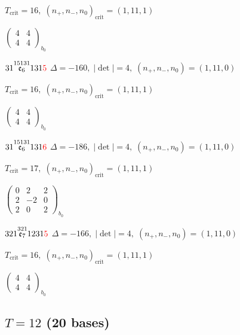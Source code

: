 \documentclass[10pt]{article}
\begin{document}
\hspace{1em}$T_{\text{crit}}=16,\; (n_+,n_-,n_0)_{\text{crit}}=(1,11,1)$

\hspace{2em}$\left(\begin{smallmatrix}4 & 4 \\ 4 & 4\end{smallmatrix}\right)_{\!b_0}$

\smallskip

$31\overset{15131}{\mathfrak{e}_6}131\textcolor{red}{5}$ \quad $\Delta=-160,\; |\det|=4,\; (n_+,n_-,n_0)=(1,11,0)$

\hspace{1em}$T_{\text{crit}}=16,\; (n_+,n_-,n_0)_{\text{crit}}=(1,11,1)$

\hspace{2em}$\left(\begin{smallmatrix}4 & 4 \\ 4 & 4\end{smallmatrix}\right)_{\!b_0}$

$31\overset{15131}{\mathfrak{e}_6}131\textcolor{red}{6}$ \quad $\Delta=-186,\; |\det|=4,\; (n_+,n_-,n_0)=(1,11,0)$

\hspace{1em}$T_{\text{crit}}=17,\; (n_+,n_-,n_0)_{\text{crit}}=(1,11,1)$

\hspace{2em}$\left(\begin{smallmatrix}0 & 2 & 2 \\ 2 & -2 & 0 \\ 2 & 0 & 2\end{smallmatrix}\right)_{\!b_0}$

\smallskip

$321\overset{321}{\mathfrak{e}_7}1231\textcolor{red}{5}$ \quad $\Delta=-166,\; |\det|=4,\; (n_+,n_-,n_0)=(1,11,0)$

\hspace{1em}$T_{\text{crit}}=16,\; (n_+,n_-,n_0)_{\text{crit}}=(1,11,1)$

\hspace{2em}$\left(\begin{smallmatrix}4 & 4 \\ 4 & 4\end{smallmatrix}\right)_{\!b_0}$


\subsection*{$T = 12$ \quad (20 bases)}
\smallskip
\end{document}
